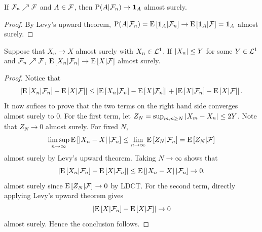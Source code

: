 \begin{corollary}
    If $\F_n\nearrow\F$ and $A\in\F$, then $\P(A|\F_n)\to\one_A$ almost surely. 
\end{corollary}
\begin{proof}
    By Levy's upward theorem, $\P(A|\F_n) = \E\sbrc{\one_A|\F_n}\to \E\sbrc{\one_A|\F} 
    = \one_A$ almost surely. 
\end{proof}

\begin{corollary}
    Suppose that $X_n\to X$ almost surely with $X_n\in\L^1$. If $\abs{X_n}\leq Y$ 
    for some $Y\in\L^1$ and $\F_n\nearrow\F$, $\E\sbrc{X_n|\F_n}\to\E\sbrc{X|\F}$ 
    almost surely. 
\end{corollary}
\begin{proof}
    Notice that 
    \begin{equation*}
        \abs{\E\sbrc{X_n|\F_n} - \E\sbrc{X|\F}}\leq \abs{\E\sbrc{X_n|\F_n} - \E\sbrc{X|\F_n}} + \abs{\E\sbrc{X|\F_n} - \E\sbrc{X|\F}}.
    \end{equation*}
    It now sufices to prove that the two terms on the right hand side converges 
    almost surely to $0$. For the first term, let $Z_N = \sup_{m,n\geq N}\abs{X_m-X_n}\leq 2Y$. 
    Note that $Z_N\to 0$ almost surely. For fixed $N$, 
    \begin{equation*}
        \limsup_{n\to\infty}\E\sbrc{\abs{X_n-X}|\F_n} \leq \lim_{n\to\infty}\E\sbrc{Z_N|\F_n} = \E\sbrc{Z_N|\F} 
    \end{equation*}
    almost surely by Levy's upward theorem. Taking $N\to\infty$ shows that 
    \begin{equation*}
        \abs{\E\sbrc{X_n|\F_n} - \E\sbrc{X|\F_n}}\leq \E\sbrc{\abs{X_n-X}|\F_n}\to 0.
    \end{equation*}
    almost surely since $\E\sbrc{Z_N|\F} \to 0$ by LDCT. For the second term, directly 
    applying Levy's upward theorem gives 
    \begin{equation*}
        \abs{\E\sbrc{X|\F_n} - \E\sbrc{X|\F}}\to 0
    \end{equation*}
    almost surely. Hence the conclusion follows. 
\end{proof}

